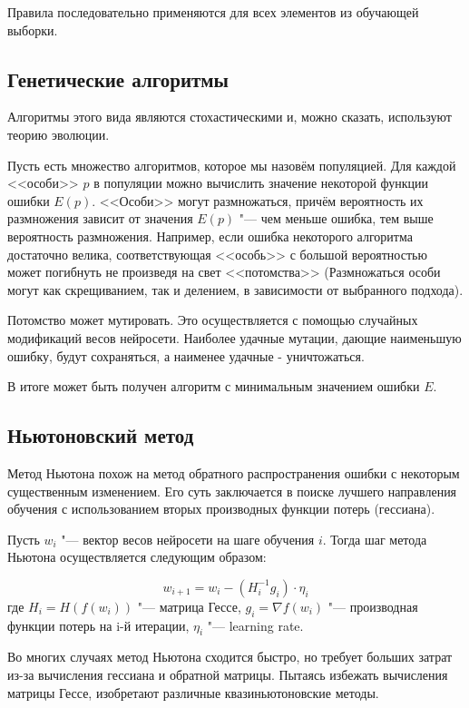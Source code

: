\documentclass[a4paper,10pt]{article}
\theoremstyle{plain} %
\theoremstyle{definition} %
\theoremstyle{remark} %
\begin{document}
Правила последовательно применяются для всех элементов из обучающей выборки.

\subsection{Генетические алгоритмы}

Алгоритмы этого вида являются стохастическими и, можно сказать, используют теорию эволюции.

Пусть есть множество алгоритмов, которое мы назовём популяцией. Для каждой <<особи>> $p$ в популяции можно вычислить значение некоторой функции ошибки $E(p)$. <<Особи>> могут размножаться, причём вероятность их размножения зависит от значения $E(p)$ "--- чем меньше ошибка, тем выше вероятность размножения. Например, если ошибка некоторого алгоритма достаточно велика, соответствующая <<особь>> с большой вероятностью может погибнуть не произведя на свет <<потомства>> (Размножаться особи могут как скрещиванием, так и делением, в зависимости от выбранного подхода).

Потомство может мутировать. Это осуществляется с помощью случайных модификаций весов нейросети. Наиболее удачные мутации, дающие наименьшую ошибку, будут сохраняться, а наименее удачные - уничтожаться.

В итоге может быть получен алгоритм с минимальным значением ошибки $E$.

\subsection{Ньютоновский метод}

Метод Ньютона похож на метод обратного распространения ошибки с некоторым существенным изменением. Его суть заключается в поиске лучшего направления обучения с использованием вторых производных функции потерь (гессиана).

Пусть $w_i$ "--- вектор весов нейросети на шаге обучения $i$. Тогда шаг метода Ньютона осуществляется следующим образом:

\begin{equation*}
    w_{i + 1} = w_i - (H_i^{-1} g_i) \cdot \eta_i
\end{equation*}
где $H_i = H(f(w_i))$ "--- матрица Гессе, $g_i = \nabla f(w_i)$ "--- производная функции потерь на i-й итерации, $\eta_i$ "--- learning rate.

Во многих случаях метод Ньютона сходится быстро, но требует больших затрат из-за вычисления гессиана и обратной матрицы. Пытаясь избежать вычисления матрицы Гессе, изобретают различные квазиньютоновские методы.
\end{document}

